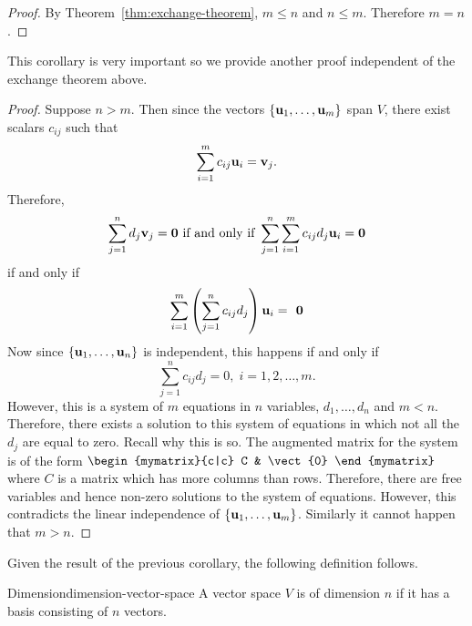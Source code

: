 \begin{proof} By Theorem~\ref{thm:exchange-theorem}, $m\leq n$ and $n\leq m$. Therefore $m=n$.
\end{proof}

This corollary is very important so we provide another proof independent of the exchange theorem above.

\begin{proof}Suppose $n > m$. Then since the vectors $\left\{\mbox{\bf u}
_{1},\ldots,\mbox{\bf u}_{m}\right\} $ span $V$, there exist scalars $c_{ij}$
such that
\begin{equation*}
\sum_{i=1}^{m}c_{ij}\mbox{\bf u}_{i}=\mbox{\bf v}_{j}.
\end{equation*}
Therefore,
\begin{equation*}
\sum_{j=1}^{n}d_{j}\vect{v}_{j}=\vect{0}
\text{ if and only if }\sum_{j=1}^{n}\sum_{i=1}^{m}c_{ij}d_{j}\vect{u}_{i}=
\vect{0}
\end{equation*}
if and only if
\begin{equation*}
\sum_{i=1}^{m}\paren{\sum_{j=1}^{n}c_{ij}d_{j}} \vect{u}_{i}=\vect{
0}
\end{equation*}
Now since $\left\{\mbox{\bf u}_{1},\ldots,\mbox{\bf u}_{n}\right\}$ is independent, this
happens if and only if
\begin{equation*}
\sum_{j=1}^{n}c_{ij}d_{j}=0,\;i=1,2,\ldots,m.
\end{equation*}
However, this is a system of $m$ equations in $n$ variables,
$d_{1},\ldots,d_{n}$ and $m<n$. Therefore, there exists a solution to
this system of equations in which not all the $d_{j}$ are equal to
zero. Recall why this is so. The augmented matrix for the system is of
the form $\begin{mymatrix}{c|c} C & \vect{0}
\end{mymatrix} $ where $C$ is a matrix which has more columns than rows. Therefore,
there are free variables and hence non-zero solutions to the system of
equations. However, this contradicts the linear independence of $\left\{
\mbox{\bf u}_{1},\ldots,\mbox{\bf u}_{m}\right\}$. Similarly it cannot happen
that $m > n$.
\end{proof}

Given the result of the previous corollary, the following definition follows.

\begin{definition}{Dimension}{dimension-vector-space}
 A vector space $V$ is of dimension $n$ if it has a basis consisting of $n$ vectors.
\end{definition}

